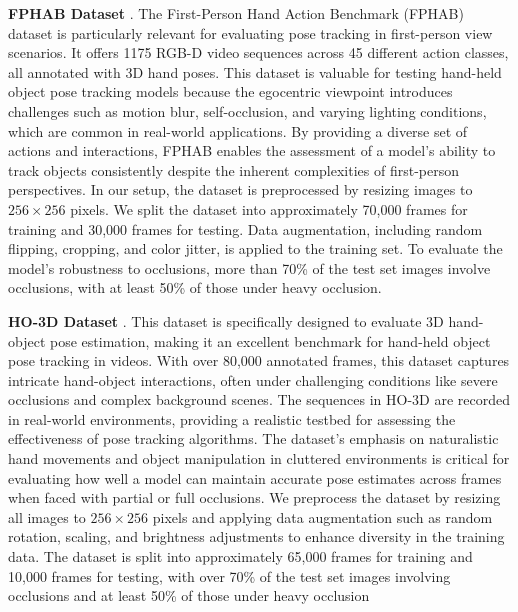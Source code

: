 \noindent \textbf{FPHAB Dataset} \cite{garcia2018first}. The First-Person Hand Action Benchmark (FPHAB) dataset is particularly relevant for evaluating pose tracking in first-person view scenarios. It offers 1175 RGB-D video sequences across 45 different action classes, all annotated with 3D hand poses. This dataset is valuable for testing hand-held object pose tracking models because the egocentric viewpoint introduces challenges such as motion blur, self-occlusion, and varying lighting conditions, which are common in real-world applications. By providing a diverse set of actions and interactions, FPHAB enables the assessment of a model's ability to track objects consistently despite the inherent complexities of first-person perspectives. In our setup, the dataset is preprocessed by resizing images to $256 \times 256$ pixels. We split the dataset into approximately 70,000 frames for training and 30,000 frames for testing. Data augmentation, including random flipping, cropping, and color jitter, is applied to the training set. To evaluate the model's robustness to occlusions, more than 70\% of the test set images involve occlusions, with at least 50\% of those under heavy occlusion.

\noindent \textbf{HO-3D Dataset} \cite{hampali2020honnotate}. This dataset is specifically designed to evaluate 3D hand-object pose estimation, making it an excellent benchmark for hand-held object pose tracking in videos. With over 80,000 annotated frames, this dataset captures intricate hand-object interactions, often under challenging conditions like severe occlusions and complex background scenes. The sequences in HO-3D are recorded in real-world environments, providing a realistic testbed for assessing the effectiveness of pose tracking algorithms. The dataset's emphasis on naturalistic hand movements and object manipulation in cluttered environments is critical for evaluating how well a model can maintain accurate pose estimates across frames when faced with partial or full occlusions. We preprocess the dataset by resizing all images to $256 \times 256$ pixels and applying data augmentation such as random rotation, scaling, and brightness adjustments to enhance diversity in the training data. The dataset is split into approximately 65,000 frames for training and 10,000 frames for testing, with over 70\% of the test set images involving occlusions and at least 50\% of those under heavy occlusion\DIFaddbegin {}

